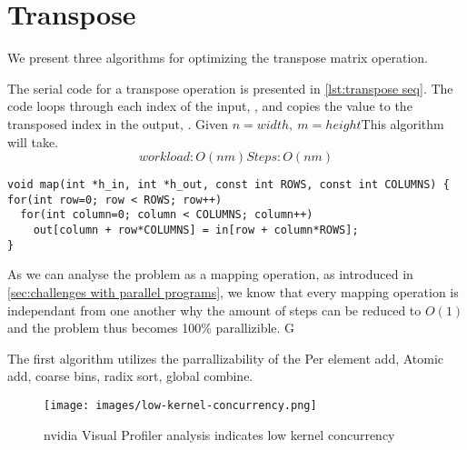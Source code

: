 \section{Transpose}
\label{sec:transposel}

We present three algorithms for optimizing the transpose matrix operation.

The serial code for a transpose operation is presented in \cref{lst:transpose seq}.
The code loops through each index of the input, , and copies the value to the transposed index in the output, .
Given $n=width,\ m=height$This algorithm will take.
\begin{equation*}
workload: O(nm)
Steps: O(nm)
\end{equation*}

\begin{lstlisting}[caption={Serial transpose}, label={lst:transpose seq}]
void map(int *h_in, int *h_out, const int ROWS, const int COLUMNS) {
for(int row=0; row < ROWS; row++)
  for(int column=0; column < COLUMNS; column++)
    out[column + row*COLUMNS] = in[row + column*ROWS];
}
\end{lstlisting}

As we can analyse the problem as a mapping operation, as introduced in \cref{sec:challenges with parallel programs}, we know that every mapping operation is independant from one another why the amount of steps can be reduced to $O(1)$ and the problem thus becomes 100\% parallizible.
G

The first algorithm utilizes the parrallizability of the  
Per element add, Atomic add, coarse bins, radix sort, global combine.


\begin{figure}[htb]
  \centering
  \texttt{[image: images/low-kernel-concurrency.png]}
  \caption{nvidia Visual Profiler analysis indicates low kernel concurrency}
  \label{fig:first impl}
\end{figure}
